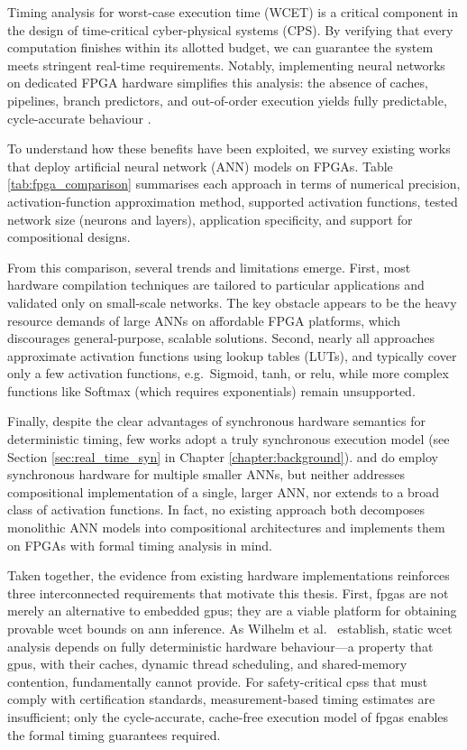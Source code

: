 Timing analysis for worst-case execution time (WCET) is a critical component in the design of time-critical cyber-physical systems (CPS). By verifying that every computation finishes within its allotted budget, we can guarantee the system meets stringent real-time requirements. Notably, implementing neural networks on dedicated FPGA hardware simplifies this analysis: the absence of caches, pipelines, branch predictors, and out-of-order execution yields fully predictable, cycle-accurate behaviour \cite{wilhelm_worst-case_2008}.  

To understand how these benefits have been exploited, we survey existing works that deploy artificial neural network (ANN) models on FPGAs. Table \ref{tab:fpga_comparison} summarises each approach in terms of numerical precision, activation-function approximation method, supported activation functions, tested network size (neurons and layers), application specificity, and support for compositional designs.  

From this comparison, several trends and limitations emerge. First, most hardware compilation techniques are tailored to particular applications and validated only on small-scale networks. The key obstacle appears to be the heavy resource demands of large ANNs on affordable FPGA platforms, which discourages general-purpose, scalable solutions. Second, nearly all approaches approximate activation functions using lookup tables (LUTs), and typically cover only a few activation functions, e.g.\ Sigmoid, \gls{tanh}, or \gls{relu}, while more complex functions like Softmax (which requires exponentials) remain unsupported.  

Finally, despite the clear advantages of synchronous hardware semantics for deterministic timing, few works adopt a truly synchronous execution model (see Section \ref{sec:real_time_syn} in Chapter \ref{chapter:background}). \cite{allen_compositional_2019} and \cite{yang_compositional_2020} do employ synchronous hardware for multiple smaller ANNs, but neither addresses compositional implementation of a single, larger ANN, nor extends to a broad class of activation functions. In fact, no existing approach both decomposes monolithic ANN models into compositional architectures and implements them on FPGAs with formal timing analysis in mind.

Taken together, the evidence from existing hardware implementations reinforces three interconnected requirements that motivate this thesis. First, \glspl{fpga} are not merely an alternative to embedded \glspl{gpu}; they are a viable platform for obtaining provable \gls{wcet} bounds on \gls{ann} inference. As Wilhelm et al.\ \cite{wilhelm_worst-case_2008} establish, static \gls{wcet} analysis depends on fully deterministic hardware behaviour---a property that \glspl{gpu}, with their caches, dynamic thread scheduling, and shared-memory contention, fundamentally cannot provide. For safety-critical \glspl{cps} that must comply with certification standards, measurement-based timing estimates are insufficient; only the cycle-accurate, cache-free execution model of \glspl{fpga} enables the formal timing guarantees required.

